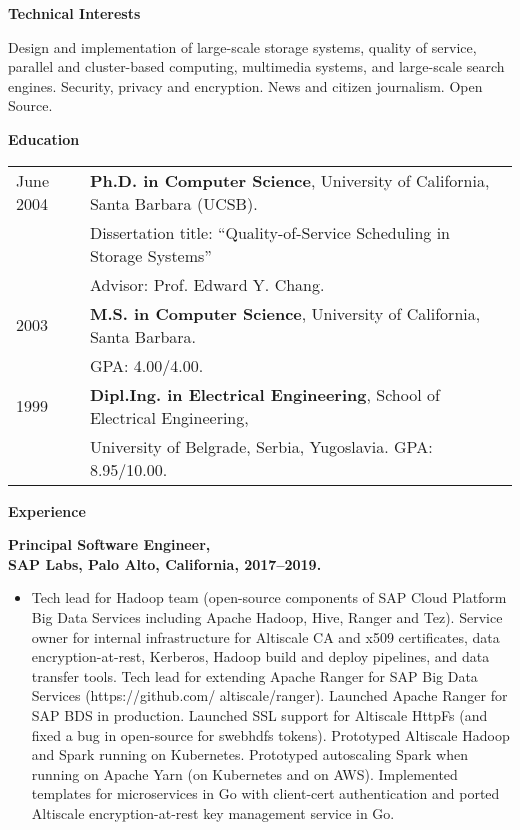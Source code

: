 \documentclass[10pt]{article}
\renewcommand{\section}[1]{ \vspace{10pt}\begin{flushleft}{\hspace{-0.2in }\Large\bf
    #1}\end{flushleft}\nopagebreak }
\begin{document}
\vspace{-5pt}
\section{Technical Interests}
Design and implementation of large-scale storage systems, quality of service, 
parallel and cluster-based computing, multimedia systems, and large-scale 
search engines. Security, privacy and encryption. News and citizen journalism. 
Open Source.


\section{Education}

\begin{tabular}{ll}
June 2004 \hspace{0.16in}	& \textbf{Ph.D. in Computer Science}, 
		University of California, Santa Barbara (UCSB). \\
        & Dissertation title: ``Quality-of-Service Scheduling in Storage Systems''\\
	&  Advisor: { Prof. Edward Y. Chang}. \\

2003		& \textbf{M.S. in Computer Science}, 
		University of California, Santa Barbara.\\ & GPA: 4.00/4.00. \\
1999 		& \textbf{Dipl.Ing. in Electrical Engineering}, 
		School of Electrical Engineering,\\
 & 		University of Belgrade, Serbia, Yugoslavia. GPA: 8.95/10.00.
\end{tabular}

\section{Experience}

{\bf Principal Software Engineer,\\
SAP Labs, Palo Alto, California, 2017--2019.}
\begin{itemize}
\vspace{-5pt}
\item
Tech lead for Hadoop team (open-source components of SAP Cloud Platform Big Data Services including Apache Hadoop, 
Hive, Ranger and Tez). 
Service owner for internal infrastructure for Altiscale CA and x509 certificates, data encryption-at-rest, 
Kerberos, Hadoop build and deploy pipelines, and data transfer tools.
Tech lead for extending Apache Ranger for SAP Big Data Services (https://github.com/ altiscale/ranger). 
Launched Apache Ranger for SAP BDS in production. Launched SSL support for Altiscale HttpFs (and fixed a bug in open-source for swebhdfs tokens). 
Prototyped Altiscale Hadoop and Spark running on Kubernetes. Prototyped autoscaling Spark when running on 
Apache Yarn (on Kubernetes and on AWS). Implemented templates for microservices in Go with client-cert authentication and
ported Altiscale encryption-at-rest key management service in Go. 
\end{itemize}
\end{document}
